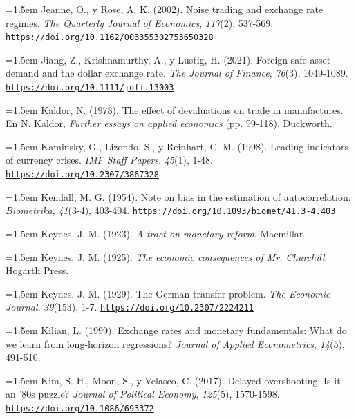 \documentclass[10pt,a4paper]{article}
\begin{document}
\noindent\hangindent=1.5em Jeanne, O., y Rose, A. K. (2002). Noise trading and exchange rate regimes. \textit{The Quarterly Journal of Economics}, \textit{117}(2), 537-569. \href{https://doi.org/10.1162/003355302753650328}{\nolinkurl{https://doi.org/10.1162/003355302753650328}}

\noindent\hangindent=1.5em Jiang, Z., Krishnamurthy, A., y Lustig, H. (2021). Foreign safe asset demand and the dollar exchange rate. \textit{The Journal of Finance}, \textit{76}(3), 1049-1089. \href{https://doi.org/10.1111/jofi.13003}{\nolinkurl{https://doi.org/10.1111/jofi.13003}}

\noindent\hangindent=1.5em Kaldor, N. (1978). The effect of devaluations on trade in manufactures. En N. Kaldor, \textit{Further essays on applied economics} (pp. 99-118). Duckworth.

\noindent\hangindent=1.5em Kaminsky, G., Lizondo, S., y Reinhart, C. M. (1998). Leading indicators of currency crises. \textit{IMF Staff Papers}, \textit{45}(1), 1-48. \href{https://doi.org/10.2307/3867328}{\nolinkurl{https://doi.org/10.2307/3867328}}

\noindent\hangindent=1.5em Kendall, M. G. (1954). Note on bias in the estimation of autocorrelation. \textit{Biometrika}, \textit{41}(3-4), 403-404. \href{https://doi.org/10.1093/biomet/41.3-4.403}{\nolinkurl{https://doi.org/10.1093/biomet/41.3-4.403}}

\noindent\hangindent=1.5em Keynes, J. M. (1923). \textit{A tract on monetary reform}. Macmillan.

\noindent\hangindent=1.5em Keynes, J. M. (1925). \textit{The economic consequences of Mr. Churchill}. Hogarth Press.

\noindent\hangindent=1.5em Keynes, J. M. (1929). The German transfer problem. \textit{The Economic Journal}, \textit{39}(153), 1-7. \href{https://doi.org/10.2307/2224211}{\nolinkurl{https://doi.org/10.2307/2224211}}

\noindent\hangindent=1.5em Kilian, L. (1999). Exchange rates and monetary fundamentals: What do we learn from long-horizon regressions? \textit{Journal of Applied Econometrics}, \textit{14}(5), 491-510.

\noindent\hangindent=1.5em Kim, S.-H., Moon, S., y Velasco, C. (2017). Delayed overshooting: Is it an '80s puzzle? \textit{Journal of Political Economy}, \textit{125}(5), 1570-1598. \href{https://doi.org/10.1086/693372}{\nolinkurl{https://doi.org/10.1086/693372}}
\end{document}
